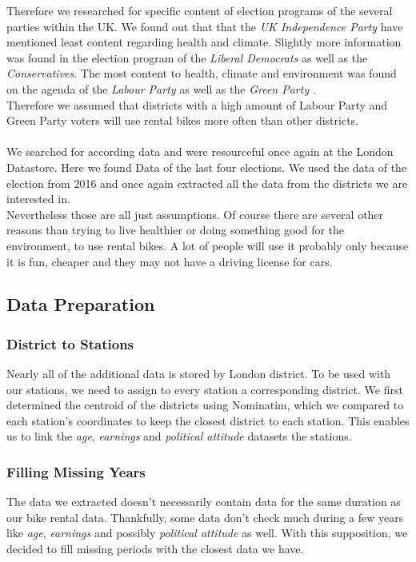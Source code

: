 Therefore we researched for specific content of election programs of the several parties within the UK.
We found out that that the \emph{UK Independence Party} have mentioned least content regarding health and climate. Slightly more information was found in the election program of the \emph{Liberal Democrats} as well as the \emph{Conservatives}. The most content to health, climate and environment was found on the agenda of the \emph{Labour Party} as well as the \emph{Green Party} \cite{SandraLavilleJohnSauven2017}.\\ Therefore we assumed that districts with a high amount of Labour Party and Green Party voters will use rental bikes more often than other districts.\\\\
We searched for according data and were resourceful once again at the London Datastore. Here we found Data of the last four elections. We used the data of the election from 2016 and once again extracted all the data from the districts we are interested in.\\
Nevertheless those are all just assumptions. Of course there are several other reasons than trying to live healthier or doing something good for the environment, to use rental bikes. A lot of people will use it probably only because it is fun, cheaper and they may not have a driving license for cars.
\subsection{Data Preparation}\label{sec:dpadditional}
\subsubsection{District to Stations}

Nearly all of the additional data is stored by London district.
To be used with our stations, we need to assign to every station a corresponding
district.
We first determined the centroid of the districts using Nominatim, which we compared
to each station's coordinates to keep the closest district to each station.
This enables us to link the \emph{age}, \emph{earnings} and \emph{political attitude}
datasets the stations.

\subsubsection{Filling Missing Years}

The data we extracted doesn't necessarily contain data for the same duration as our
bike rental data. Thankfully, some data don't check much during a few years like
\emph{age}, \emph{earnings} and possibly \emph{political attitude} as well.
With this supposition, we decided to fill missing periods with the closest data
we have.

